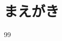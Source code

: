 \documentclass[paper]{ieicej}
\begin{document}
\begin{abstract}
\end{abstract}
\begin{keyword}
\end{keyword}
\begin{eabstract}
\end{eabstract}
\begin{ekeyword}
\end{ekeyword}
\maketitle

\section{まえがき}


\ack %

%
%
\begin{thebibliography}{99}%
\bibitem{}
\end{thebibliography}

\appendix
\section{}

\begin{biography}
\profile{}{}{}
\end{biography}
\end{document}

